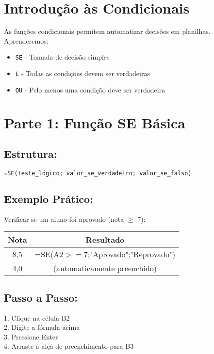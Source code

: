 \documentclass[11pt]{article}
\title{\color{blue}{Atividade Prática - Funções Lógicas no Excel (Explicada)}}
\author{Professor: Jefferson \\ \color{blue}{Pensamento Computacional}}
\date{}
\begin{document}
\maketitle


\section*{Introdução às Condicionais}

As funções condicionais permitem automatizar decisões em planilhas. Aprenderemos:

\begin{itemize}
\item \texttt{SE} - Tomada de decisão simples
\item \texttt{E} - Todas as condições devem ser verdadeiras
\item \texttt{OU} - Pelo menos uma condição deve ser verdadeira
\end{itemize}

\section*{Parte 1: Função SE Básica}

\subsection*{Estrutura:}
\begin{verbatim}
=SE(teste_lógico; valor_se_verdadeiro; valor_se_falso)
\end{verbatim}

\subsection*{Exemplo Prático:}
Verificar se um aluno foi aprovado (nota $\geq$ 7):

\begin{tabular}{|c|c|}
\hline
\textbf{Nota} & \textbf{Resultado} \\
\hline
8,5 & =SE(A2$>=$7;"Aprovado";"Reprovado") \\
\hline
4,0 & (automaticamente preenchido) \\
\hline
\end{tabular}

\subsection*{Passo a Passo:}
1. Clique na célula B2 \\
2. Digite a fórmula acima \\
3. Pressione Enter \\
4. Arraste a alça de preenchimento para B3
\end{document}

